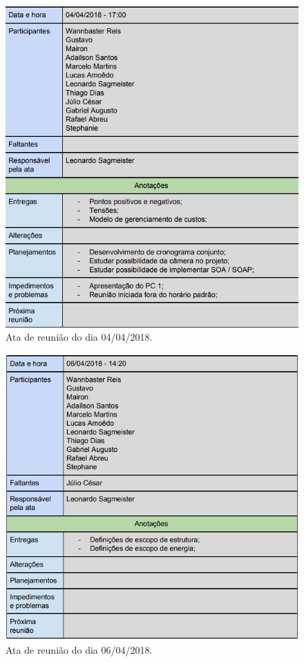 \begin{apendicesenv}
\begin{figure}[H]
	\centering
	\includegraphics[width=15cm]{figuras/apendice_b.png}
	\caption{Ata de reunião do dia 04/04/2018.
	} \label{apendice_b}
\end{figure}

\begin{figure}[H]
	\centering
	\includegraphics[width=15cm]{figuras/apendice_c.png}
	\caption{Ata de reunião do dia 06/04/2018.
	} \label{apendice_c}
\end{figure}


\end{apendicesenv}
